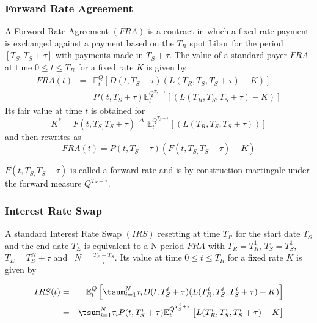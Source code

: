 \documentclass[3pt]{article}
\begin{document}
\subsubsection{Forward Rate Agreement}

A Forword Rate Agreement $(FRA)$ is a contract in which a fixed rate payment
is exchanged against a payment based on the $T_{R}$ spot Libor for the
period $\left[ T_{S},T_{S}+\tau \right] $ with payments made in $T_{S}+\tau
. $ The value of a standard payer $FRA$ at time $0\leq t\leq T_{R}$ for a
fixed rate $K$ is given by%
\begin{eqnarray*}
FRA(t) &=&\mathbb{E}_{t}^{Q}\left[ D(t,T_{S}+\tau )(L(T_{R},T_{S},T_{S}+\tau
)-K)\right] \\
&=&P(t,T_{S}+\tau )\mathbb{E}_{t}^{Q^{T_{S}+\tau }}\left[ \left(
L(T_{R},T_{S},T_{S}+\tau )-K\right) \right]
\end{eqnarray*}%
Its fair value at time $t$ is obtained for 
\begin{equation*}
K^{\ast }=F(t,T_{S,}T_{S}+\tau )\overset{\Delta }{=}\mathbb{E}%
_{t}^{Q^{T_{S}+\tau }}\left[ \left( L(T_{R},T_{S},T_{S}+\tau )\right) \right]
\end{equation*}%
and then rewrites as%
\begin{equation*}
FRA(t)=P(t,T_{S}+\tau )\left( F(t,T_{S,}T_{S}+\tau )-K\right)
\end{equation*}

$F(t,T_{S,}T_{S}+\tau )$ is called a forward rate and is by construction
martingale under the forward measure $Q^{T_{S}+\tau }.$

\subsubsection{Interest Rate Swap}

A standard Interest Rate Swap $(IRS)$ resetting at time $T_{R}$ for the
start date $T_{S}$ and the end date $T_{E}$ is equivalent to a N-period $FRA$
with $T_{R}=T_{R}^{1}$, $T_{S}=T_{S}^{1}$, $T_{E}=T_{S}^{N}+\tau $ and \ $N=%
\frac{T_{E}-T_{S}}{\tau }.$ Its value at time $0\leq t\leq T_{R}$ for a
fixed rate $K$ is given by

\begin{eqnarray*}
IRS(t) &=&\mathbb{E}_{t}^{Q}\left[ \tsum_{i=1}^{N}\tau
_{i}D(t,T_{S}^{i}+\tau )(L(T_{R}^{i},T_{S}^{i},T_{S}^{i}+\tau )-K)\right] \\
&=&\tsum_{i=1}^{N}\tau _{i}P(t,T_{S}^{i}+\tau )\mathbb{E}_{t}^{Q^{T_{S}^{i}+%
\tau }}\left[ L(T_{R}^{i},T_{S}^{i},T_{S}^{i}+\tau )-K\right]
\end{eqnarray*}
\end{document}
